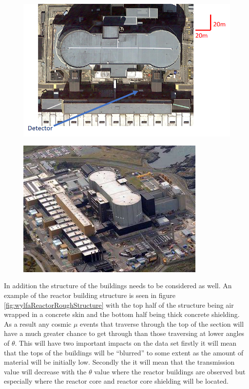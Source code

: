 \begin{figure}[htbp]
 \centering
 \includegraphics[width=0.75\linewidth]{Chapter5/Figs/wylfaRasterNew/DetectorPositionTopDown.png}
 \label{fig:DetectorPositionTopDown}
\end{figure}

\begin{figure}[htbp]
 \centering
 \includegraphics[width=0.6\linewidth]{Chapter5/Figs/Raster/wylfaArielView.png}
 \label{fig:wylfaAir}
\end{figure}

In addition the structure of the buildings needs to be considered as well. An example of the reactor building structure is seen in figure \ref{fig:wylfaReactorRoughStructure} with the top half of the structure being air wrapped in a concrete skin and the bottom half being thick concrete shielding. As a result any cosmic $\mu$ events that traverse through the top of the section will have a much greater chance to get through than those traversing at lower angles of $\theta$. This will have two important impacts on the data set firstly it will mean that the tops of the buildings will be ``blurred'' to some extent as the amount of material will be initially low. Secondly the it will mean that the transmission value will decrease with the $\theta$ value where the reactor buildings are observed but especially where the reactor core and reactor core shielding will be located. 

